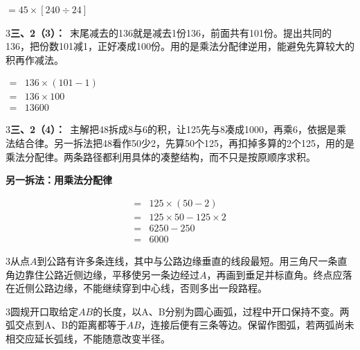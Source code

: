 \documentclass[multi=snippet,border={5bp 20bp 5bp 5bp}]{standalone}
\newenvironment{snippet}[3]{\begin{minipage}{#1bp}\color{answerred}\fontsize{#2}{#3}\selectfont\raggedright}{\end{minipage}}
\begin{document}
\begin{snippet}{87.07808837890627}{10}{12.8}\SourceSans\setlength{\mathindent}{2bp}\(\displaystyle=45\times[240\div24]\)\end{snippet}
\begin{snippet}{505}{11.5}{14}\begin{multicols}{3}\raggedcolumns \textbf{三、2（3）：}\ 末尾减去的136就是减去1份136，前面共有101份。提出共同的136，把份数101减1，正好凑成100份。用的是乘法分配律逆用，能避免先算较大的积再作减法。\end{multicols}\end{snippet}
\begin{snippet}{157.0}{10.5}{12.8}\SourceSans\setlength{\mathindent}{2bp}\(\begin{aligned}={}&136\times(101-1)\\={}&136\times100\\={}&13600\end{aligned}\)\end{snippet}
\begin{snippet}{505}{11.5}{14}\begin{multicols}{3}\raggedcolumns \textbf{三、2（4）：}\ 主解把48拆成8与6的积，让125先与8凑成1000，再乘6，依据是乘法结合律。另一拆法把48看作50少2，先算50个125，再扣掉多算的2个125，用的是乘法分配律。两条路径都利用具体的凑整结构，而不只是按原顺序求积。\par \textbf{另一拆法：用乘法分配律}\par \[\begin{aligned}={}&125\times(50-2)\\={}&125\times50-125\times2\\={}&6250-250\\={}&6000\end{aligned}\]\end{multicols}\end{snippet}
\begin{snippet}{505}{11.5}{14}\begin{multicols}{3}\raggedcolumns 从点\(A\)\allowbreak 到公路有许多条连线，其中与公路边缘垂直的线段最短。用三角尺一条直角边靠住公路近侧边缘，平移使另一条边经过\(A\)\allowbreak ，再画到垂足并标直角。终点应落在近侧公路边缘，不能继续穿到中心线，否则多出一段路程。\end{multicols}\end{snippet}
\begin{snippet}{505}{11.5}{14}\begin{multicols}{3}\raggedcolumns 圆规开口取给定\(AB\)\allowbreak 的长度，以A、B分别为圆心画弧，过程中开口保持不变。两弧交点到A、B的距离都等于\(AB\)\allowbreak ，连接后便有三条等边。保留作图弧，若两弧尚未相交应延长弧线，不能随意改变半径。\end{multicols}\end{snippet}
\end{document}
